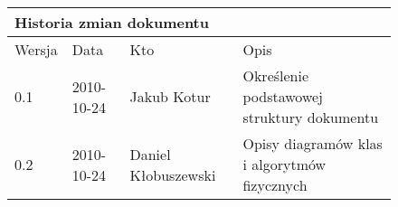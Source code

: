 \begin{figure}[h]
	\centering

\begin{tabular}{|p{}|p{}|p{}|p{}|}
	\hline
	\multicolumn{4}{|l|}{Historia zmian dokumentu} \\
	\hline
	Wersja & Data & Kto & Opis \\
	\hline
	0.1 & 2010-10-24 & Jakub Kotur &
	Określenie podstawowej struktury dokumentu \\
	\hline
	0.2 & 2010-10-24 & Daniel Kłobuszewski &
	Opisy diagramów klas i algorytmów fizycznych \\
	\hline
\end{tabular}

	\label{tab:metric}
\end{figure}

